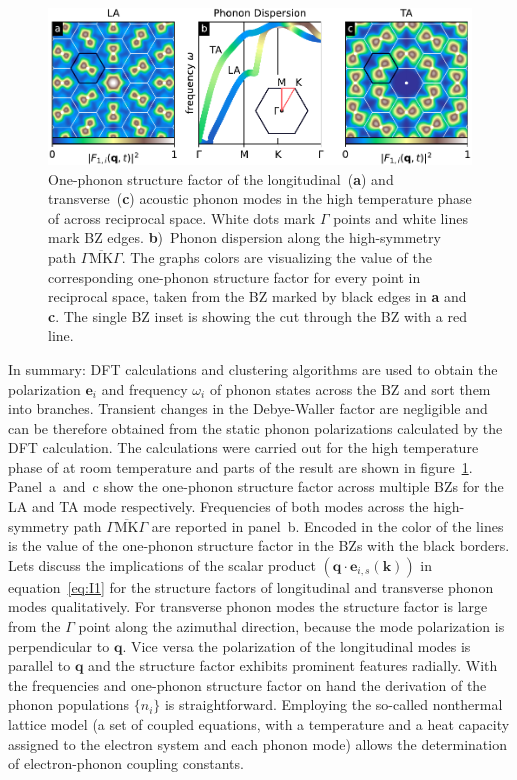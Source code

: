 \begin{figure}[!t]
	\includegraphics[width=\columnwidth]{figs/ops.pdf}
	\caption{One-phonon structure factor of the longitudinal~(\textbf{a}) and transverse~(\textbf{c}) acoustic phonon modes in the high temperature phase of \ts\space across reciprocal space. White dots mark $\Gamma$ points and white lines mark \ac{BZ} edges. \textbf{b})~Phonon dispersion along the high-symmetry path $\overline{\Gamma\mathrm{MK}\Gamma}$. The graphs colors are visualizing the value of the corresponding one-phonon structure factor for every point in reciprocal space, taken from the \ac{BZ} marked by black edges in \textbf{a} and \textbf{c}. The single \ac{BZ} inset is showing the cut through the \ac{BZ} with a red line.}
	\label{fig:ops}
\end{figure}

In summary: \Ac{DFT} calculations and clustering algorithms are used to obtain the polarization $\mathbf{e}_{i}$ and frequency $\omega_{i}$ of phonon states across the \ac{BZ} and sort them into branches.
Transient changes in the Debye-Waller factor are negligible and can be therefore obtained from the static phonon polarizations calculated by the \ac{DFT} calculation.
The calculations were carried out for the high temperature phase of \ts\space at room temperature and parts of the result are shown in figure~\ref{fig:ops}.
Panel~a~and~c show the one-phonon structure factor across multiple \acp{BZ} for the \ac{LA} and \ac{TA} mode respectively.
Frequencies of both modes across the high-symmetry path $\overline{\Gamma\mathrm{MK}\Gamma}$ are reported in panel~b.
Encoded in the color of the lines is the value of the one-phonon structure factor in the \acp{BZ} with the black borders.
Lets discuss the implications of the scalar product $\left( \mathbf{q}\cdot\mathbf{e}_{i, s}(\mathbf{k}) \right)$ in equation~\ref{eq:I1} for the structure factors of longitudinal and transverse phonon modes qualitatively.
For transverse phonon modes the structure factor is large from the $\Gamma$ point along the azimuthal direction, because the mode polarization is perpendicular to $\mathbf{q}$.
Vice versa the polarization of the longitudinal modes is parallel to $\mathbf{q}$ and the structure factor exhibits prominent features radially.
With the frequencies and one-phonon structure factor on hand the derivation of the phonon populations $\{n_{i}\}$ is straightforward.
Employing the so-called nonthermal lattice model\cite{waldecker2016} (a set of coupled equations, with a temperature and a heat capacity assigned to the electron system and each phonon mode) allows the determination of electron-phonon coupling constants.


